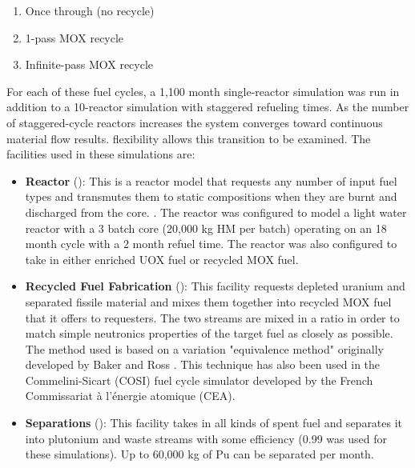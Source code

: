 \begin{enumerate}
    \item Once through (no recycle) 
    \item 1-pass MOX recycle
    \item Infinite-pass MOX recycle
\end{enumerate}

For each of these fuel cycles, a 1,100 month single-reactor \Cyclus simulation
was run in addition to a 10-reactor simulation with staggered refueling times.
As the number of staggered-cycle reactors increases the system converges
toward continuous material flow results.  \Cyclus flexibility allows this
transition to be examined.  The facilities used in these simulations are:

\begin{itemize}

    \item \textbf{Reactor} (): This is a reactor
        model that requests any number of input fuel types and transmutes them
        to static compositions when they are burnt and discharged from the
        core.  . The reactor was configured to model a light water reactor
        with a 3 batch core (20,000 kg HM per batch) operating on an 18 month
        cycle with a 2 month refuel time.  The reactor was also configured to
        take in either enriched UOX fuel or recycled MOX fuel.

    \item \textbf{Recycled Fuel Fabrication} (): This
        facility requests depleted uranium and separated fissile material and
        mixes them together into recycled MOX fuel that it offers to
        requesters.  The two streams are mixed in a ratio in order to match
        simple neutronics properties of the target fuel as closely as
        possible.  The method used is based on a variation "equivalence
        method" originally developed by Baker and Ross
        \cite{baker1963comparison}.  This technique has also been used in the
        Commelini-Sicart (COSI) fuel cycle simulator developed by the French
        Commissariat \`{a} l'\'{e}nergie atomique (CEA).

    \item \textbf{Separations} (): This facility
        takes in all kinds of spent fuel and separates it into plutonium and
        waste streams with some efficiency (0.99 was used for these
        simulations).  Up to 60,000 kg of Pu can be separated per month.


\end{itemize}
